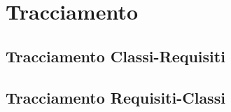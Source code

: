 \documentclass{scalatekids-article}
\begin{document}
\section{Tracciamento}

\subsection{Tracciamento Classi-Requisiti}

\subsection{Tracciamento Requisiti-Classi}

\newpage
\appendix
\label{sec:appendice}

\newpage
\listoftables
\newpage
\listoffigures
\end{document}
